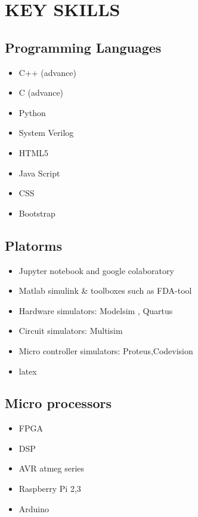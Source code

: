 \documentclass[11pt,a4paper,roman]{moderncv}        %
\begin{document}
\section{KEY SKILLS}
	\begin{minipage}[t]{0.5 \textwidth}
		\subsection{Programming Languages}
		\begin{itemize}
			\item C++ (advance)
			\item C (advance)
			\item Python
			\item System Verilog
			\item HTML5 
			\item Java Script
			\item CSS
			\item Bootstrap
		\end{itemize}
	\end{minipage}
	\begin{minipage}[t]{0.5 \textwidth}
		\subsection{Platorms}
		\begin{itemize}
			\item Jupyter notebook and google colaboratory
			\item Matlab simulink \& toolboxes such as FDA-tool
			\item Hardware simulators: Modelsim , Quartus 
			\item Circuit simulators: Multisim
			\item Micro controller simulators: Proteus,Codevision
			\item latex
		\end{itemize}
		\subsection{Micro processors}
		\begin{itemize}
			\item FPGA
			\item DSP
			\item AVR atmeg series
			\item Raspberry Pi 2,3
			\item Arduino
		\end{itemize}
	
	\end{minipage}	
\end{document}
